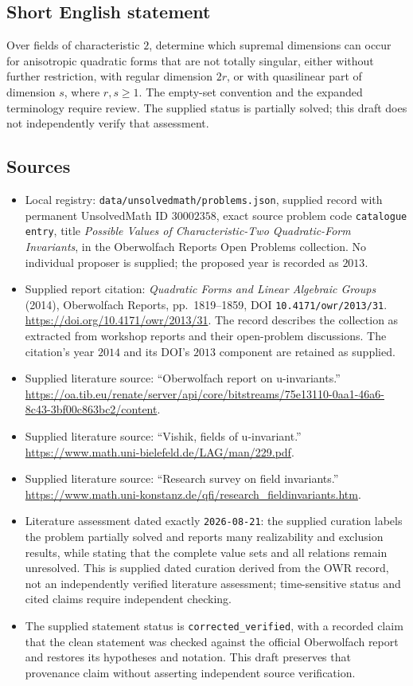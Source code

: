 \documentclass[11pt]{article}
\begin{document}
\subsection{Short English statement}
Over fields of characteristic \(2\), determine which supremal dimensions can occur for anisotropic quadratic forms that are not totally singular, either without further restriction, with regular dimension \(2r\), or with quasilinear part of dimension \(s\), where \(r,s\geq1\). The empty-set convention and the expanded terminology require review. The supplied status is partially solved; this draft does not independently verify that assessment.
\subsection{Sources}
\begin{itemize}
\item Local registry: \texttt{data/unsolvedmath/problems.json}, supplied record with permanent UnsolvedMath ID \(30002358\), exact source problem code \texttt{catalogue entry}, title \emph{Possible Values of Characteristic-Two Quadratic-Form Invariants}, in the Oberwolfach Reports Open Problems collection. No individual proposer is supplied; the proposed year is recorded as \(2013\).
\item Supplied report citation: \emph{Quadratic Forms and Linear Algebraic Groups} (2014), Oberwolfach Reports, pp.\ 1819--1859, DOI \texttt{10.4171/owr/2013/31}. \url{https://doi.org/10.4171/owr/2013/31}. The record describes the collection as extracted from workshop reports and their open-problem discussions. The citation's year \(2014\) and its DOI's \(2013\) component are retained as supplied.
\item Supplied literature source: ``Oberwolfach report on u-invariants.'' \url{https://oa.tib.eu/renate/server/api/core/bitstreams/75e13110-0aa1-46a6-8c43-3bf00c863bc2/content}.
\item Supplied literature source: ``Vishik, fields of u-invariant.'' \url{https://www.math.uni-bielefeld.de/LAG/man/229.pdf}.
\item Supplied literature source: ``Research survey on field invariants.'' \url{https://www.math.uni-konstanz.de/qfi/research_fieldinvariants.htm}.
\item Literature assessment dated exactly \texttt{2026-08-21}: the supplied curation labels the problem partially solved and reports many realizability and exclusion results, while stating that the complete value sets and all relations remain unresolved. This is supplied dated curation derived from the OWR record, not an independently verified literature assessment; time-sensitive status and cited claims require independent checking.
\item The supplied statement status is \texttt{corrected\_verified}, with a recorded claim that the clean statement was checked against the official Oberwolfach report and restores its hypotheses and notation. This draft preserves that provenance claim without asserting independent source verification.
\end{itemize}
\end{document}

